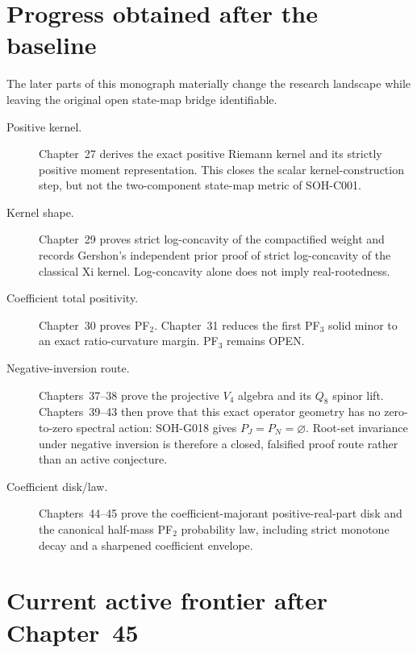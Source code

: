 \section{Progress obtained after the baseline}

The later parts of this monograph materially change the research landscape while leaving the original open state-map bridge identifiable.

\begin{description}
 \item[Positive kernel.] Chapter~27 derives the exact positive Riemann kernel and its strictly positive moment representation. This closes the scalar kernel-construction step, but not the two-component state-map metric of SOH-C001.
 \item[Kernel shape.] Chapter~29 proves strict log-concavity of the compactified weight and records Gershon's independent prior proof of strict log-concavity of the classical Xi kernel. Log-concavity alone does not imply real-rootedness.
 \item[Coefficient total positivity.] Chapter~30 proves PF$_2$. Chapter~31 reduces the first PF$_3$ solid minor to an exact ratio-curvature margin. PF$_3$ remains OPEN.
 \item[Negative-inversion route.] Chapters~37--38 prove the projective $V_4$ algebra and its $Q_8$ spinor lift. Chapters~39--43 then prove that this exact operator geometry has no zero-to-zero spectral action: SOH-G018 gives $P_J=P_N=\varnothing$. Root-set invariance under negative inversion is therefore a closed, falsified proof route rather than an active conjecture.
 \item[Coefficient disk/law.] Chapters~44--45 prove the coefficient-majorant positive-real-part disk and the canonical half-mass PF$_2$ probability law, including strict monotone decay and a sharpened coefficient envelope.
\end{description}

\section{Current active frontier after Chapter~45}

